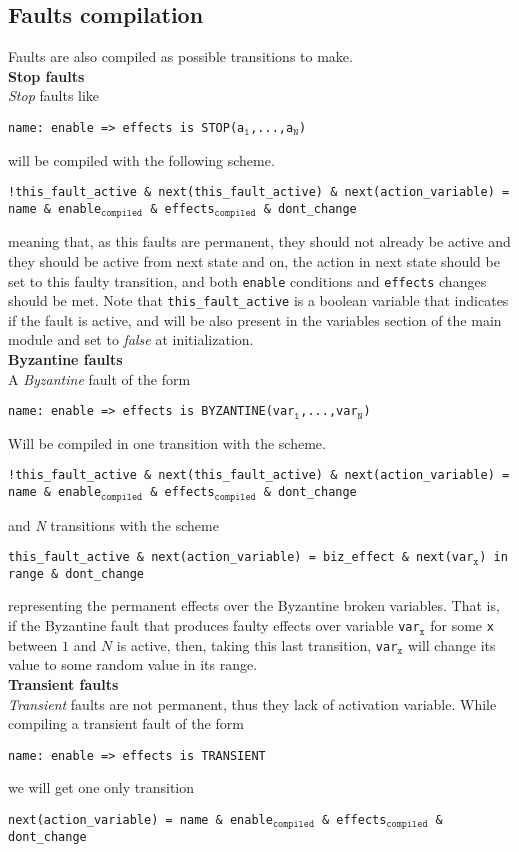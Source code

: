 \documentclass{llncs2e/llncs}
\newcommand{\undtt}[1]{$_{\texttt{#1}}$}                %
\newcommand{\undfll}[1]{\undtt{#1}}                     %
\newcommand{\ssubt}[1]{{\noindent\textbf{#1}}\enter}        %
\newcommand{\textfll}[1]{\texttt{#1}}                   %
\newcommand{\enter}{\\[0.2cm]}
\begin{document}
\subsection{Faults compilation}
Faults are also compiled as possible transitions to make.\enter
\ssubt{Stop faults}
\textit{Stop} faults like
\begin{center}
\textfll{name: enable => effects is STOP(a\undfll{1},...,a\undfll{N})}
\end{center}
will be compiled with the following scheme.
\begin{center}
\texttt{!this\_fault\_active \& next(this\_fault\_active) \& next(action\_variable) = name \& enable\undfll{compiled} \& effects\undfll{compiled} \& dont\_change }
\end{center}
meaning that, as this faults are permanent, they should not already be active and they should be active from next state and on, the action in next state should be set to this faulty transition, and both \textfll{enable} conditions and \textfll{effects} changes should be met. Note that \textfll{this\_fault\_active} is a boolean variable that indicates if the fault is active, and will be also present in the variables section of the main module and set to \textit{false} at initialization.\enter
\ssubt{Byzantine faults}
A \textit{Byzantine} fault of the form
\begin{center}
\textfll{name: enable => effects is BYZANTINE(var\undfll{1},...,var\undfll{N})}
\end{center}
Will be compiled in one transition with the scheme.
\begin{center}
\textfll{!this\_fault\_active \& next(this\_fault\_active) \& next(action\_variable) = name \& enable\undfll{compiled} \& effects\undfll{compiled} \& dont\_change}
\end{center}
and \textit{N} transitions with the scheme
\begin{center}
\textfll{this\_fault\_active \& next(action\_variable) = biz\_effect \& next(var\undfll{x}) in range \& dont\_change}
\end{center}
representing the permanent effects over the Byzantine broken variables. That is, if the Byzantine fault that produces faulty effects over variable \textfll{var\undfll{x}} for some \textfll{x} between $1$ and $N$ is active, then, taking this last transition, \textfll{var\undfll{x}} will change its value to some random value in its range.\enter
\ssubt{Transient faults}
\textit{Transient} faults are not permanent, thus they lack of activation variable. While compiling a transient fault of the form
\begin{center}
\textfll{name: enable => effects is TRANSIENT}
\end{center}
we will get one only transition
\begin{center}
\textfll{next(action\_variable) = name \& enable\undfll{compiled} \& effects\undfll{compiled} \& dont\_change}
\end{center}
\end{document}

